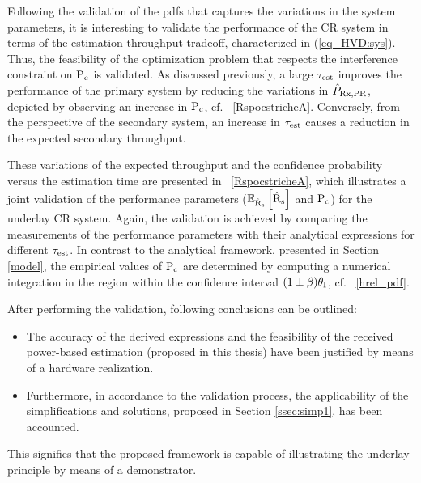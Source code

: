 Following the validation of the pdfs that captures the variations in the system parameters, it is interesting to validate the performance of the CR system in terms of the estimation-throughput tradeoff, characterized in (\ref{eq_HVD:sys}). Thus, the feasibility of the optimization problem that respects the interference constraint on $\text{P}_{\text{c}}$ is validated. As discussed previously, a large $\tau_{\text{est}}$ improves the performance of the primary system by reducing the variations in $\hat{P}_{\text{Rx,PR}}$, depicted by observing an increase in $\text{P}_{\text{c}}$, cf. \figurename~\ref{RspocstricheA}. Conversely, from the perspective of the secondary system, an increase in $\tau_{\text{est}}$ causes a reduction in the expected secondary throughput. 

These variations of the expected throughput and the confidence probability versus the estimation time are presented in \figurename~\ref{RspocstricheA}, which illustrates a joint validation of the performance parameters (${\mathbb E}_{\hat{\text{{R}}}_{\text{s}}}\left[ \hat{\text{{R}}}_{\text{s}} \right]$ and $\text{P}_{\text{c}}$) for the underlay CR system. Again, the validation is achieved by comparing the measurements of the performance parameters with their analytical expressions for different $\tau_{\text{est}}$. In contrast to the analytical framework, presented in Section \ref{model}, the empirical values of $\text{P}_{\text{c}}$ are determined by computing a numerical integration in the region within the confidence interval $(1  \pm \beta)  \theta_\textrm{I}$, cf. \figurename~\ref{hrel_pdf}. 

After performing the validation, following conclusions can be outlined: 
\begin{itemize}
\item The accuracy of the derived expressions and the feasibility of the received power-based estimation (proposed in this thesis) have been justified by means of a hardware realization.
\item Furthermore, in accordance to the validation process, the applicability of the simplifications and solutions, proposed in Section \ref{ssec:simp1}, has been accounted.    
\end{itemize}
This signifies that the proposed framework is capable of illustrating the underlay principle by means of a demonstrator.

